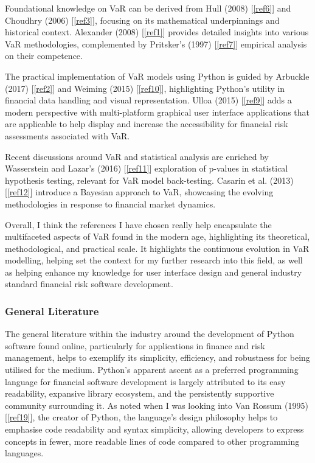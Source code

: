 \documentclass{article}
\begin{document}
Foundational knowledge on VaR can be derived from Hull (2008) [\ref{ref6}] and Choudhry (2006) [\ref{ref3}], focusing on its mathematical underpinnings and historical context. Alexander (2008) [\ref{ref1}] provides detailed insights into various VaR methodologies, complemented by Pritsker's (1997) [\ref{ref7}] empirical analysis on their competence.\\\vspace{0.3cm}

The practical implementation of VaR models using Python is guided by Arbuckle (2017) [\ref{ref2}] and Weiming (2015) [\ref{ref10}], highlighting Python's utility in financial data handling and visual representation. Ulloa (2015) [\ref{ref9}]  adds a modern perspective with multi-platform graphical user interface applications that are applicable to help display and increase the accessibility for financial risk assessments associated with VaR.\\\vspace{0.3cm}

Recent discussions around VaR and statistical analysis are enriched by Wasserstein and Lazar's (2016) [\ref{ref11}] exploration of p-values in statistical hypothesis testing, relevant for VaR model back-testing. Casarin et al. (2013) [\ref{ref12}] introduce a Bayesian approach to VaR, showcasing the evolving methodologies in response to financial market dynamics.\\\vspace{0.3cm}

Overall, I think the references I have chosen really help encapsulate the multifaceted aspects of VaR found in the modern age, highlighting its theoretical, methodological, and practical scale. It highlights the continuous evolution in VaR modelling, helping set the context for my further research into this field, as well as helping enhance my knowledge for user interface design and general industry standard financial risk software development.

\newpage
\subsubsection{General Literature}

The general literature within the industry around the development of Python software found online, particularly for applications in finance and risk management, helps to exemplify its simplicity, efficiency, and robustness for being utilised for the medium. Python's apparent ascent as a preferred programming language for financial software development is largely attributed to its easy readability, expansive library ecosystem, and the persistently supportive community surrounding it. As noted when I was looking into Van Rossum (1995) [\ref{ref19}], the creator of Python, the language's design philosophy helps to emphasise code readability and syntax simplicity, allowing developers to express concepts in fewer, more readable lines of code compared to other programming languages.\\\vspace{0.3cm}
\end{document}
